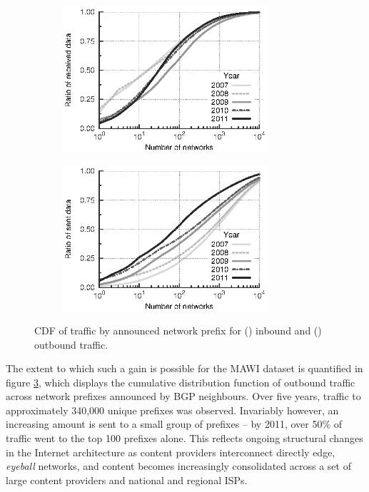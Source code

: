 \begin{figure}[t]
    \begin{subfigure}[b]{0.5\linewidth}
        \centering
        \includegraphics[width=3.0in]{figures/inflex/ecdf_network_dst_data_bytes_from_10000.eps}
        \caption{\label{prefix_in}}
    \end{subfigure}
    \begin{subfigure}[b]{0.5\linewidth}
        \centering
        \includegraphics[width=3.0in]{figures/inflex/ecdf_network_dst_data_bytes_to_10000.eps}
        \caption{\label{prefix_out}}
    \end{subfigure}%
    \caption{\acs{CDF} of traffic by announced network prefix for () inbound and () outbound traffic.\label{fig:prefix}}
    \hfill
\end{figure}

The extent to which such a gain is possible for the \ac{MAWI} dataset is quantified in figure \ref{fig:prefix}, which displays the cumulative distribution function of outbound traffic across network prefixes announced by BGP neighbours.
Over five years, traffic to approximately 340,000 unique prefixes was observed.
Invariably however, an increasing amount is sent to a small group of prefixes -- by 2011, over 50\% of traffic went to the top 100 prefixes alone.
This reflects ongoing structural changes in the Internet architecture as content providers interconnect directly edge, \emph{eyeball} networks, and content becomes increasingly consolidated across a set of large content providers and national and regional ISPs.


